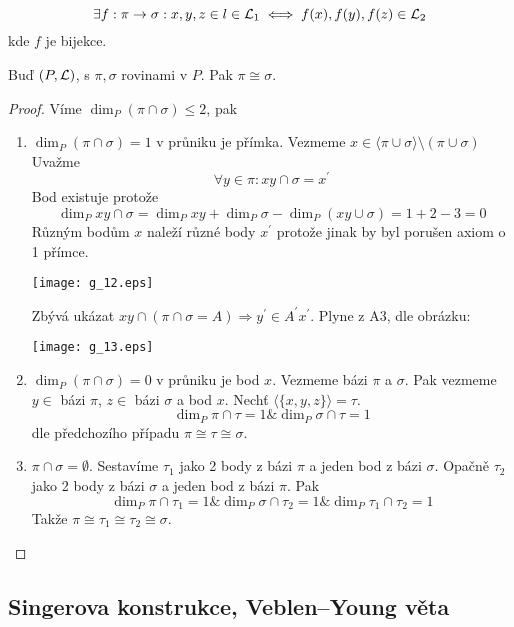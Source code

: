 \begin{definition}
	\[ \exists f: \pi \to \sigma: x, y, z \in l \in \operatorname{\mathcal{L}}_1 \iff f(x), f(y), f(z) \in \operatorname{\mathcal{L}}_2 \]
	kde $f$ je bijekce.
\end{definition}

\begin{theorem}
    Buď $(P,\operatorname{\mathcal{L}})$, s $\pi,\sigma$ rovinami v $P$.
    Pak $\pi\cong\sigma$.
\end{theorem}
\begin{proof}
	Víme $\dim_P(\pi \cap \sigma) \leq 2$, pak
    \begin{enumerate}
        \item $\dim_P(\pi \cap \sigma) = 1$ v průniku je přímka.
		Vezmeme $x \in \langle \pi \cup \sigma \rangle \setminus (\pi \cup \sigma)$
		Uvažme
		\[ \forall y \in \pi: xy \cap \sigma = x^{\prime} \]
		Bod existuje protože
		\[ \dim_P xy \cap \sigma = \dim_P xy + \dim_P \sigma - \dim_P(xy \cup \sigma) = 1 + 2 - 3 = 0 \]
		Různým bodům $x$ naleží různé body $x^{\prime}$ protože jinak by byl porušen axiom o 1 přímce.

    	\texttt{[image: g\_12.eps]}

	Zbývá ukázat $xy \cap (\pi \cap \sigma = A) \Rightarrow y^{\prime} \in A^{\prime}x^{\prime}$.
	Plyne z A3, dle obrázku:

    	\texttt{[image: g\_13.eps]}

        \item $\dim_P(\pi \cap \sigma) = 0$ v průniku je bod $x$.
		Vezmeme bázi $\pi$ a $\sigma$.
		Pak vezmeme $y \in$ bázi $\pi$, $z \in$ bázi $\sigma$ a bod $x$.
		Nechť $\langle \{ x, y, z \} \rangle = \tau$.
		\[ \dim_P \pi \cap \tau = 1 \& \dim_P \sigma \cap \tau = 1 \]
		dle předchozího případu $\pi \cong \tau \cong \sigma$.
	\item $\pi \cap \sigma = \emptyset$.
		Sestavíme $\tau_1$ jako 2 body z bázi $\pi$ a jeden bod z bázi $\sigma$.
		Opačně $\tau_2$ jako 2 body z bázi $\sigma$ a jeden bod z bázi $\pi$.
		Pak
		\[ \dim_P \pi \cap \tau_1 = 1 \& \dim_P \sigma \cap \tau_2 = 1 \& \dim_P \tau_1 \cap \tau_2 = 1 \]
		Takže $\pi \cong \tau_1 \cong \tau_2 \cong \sigma$.
    \end{enumerate}
\end{proof}

\subsection{Singerova konstrukce, Veblen–Young věta}


